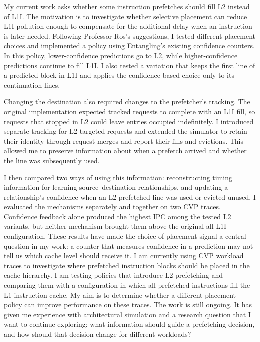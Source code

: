 \documentclass[11pt,a4paper]{article}
\begin{document}
My current work asks whether some instruction prefetches should fill L2 instead of L1I. The motivation is to investigate whether selective placement can reduce L1I pollution enough to compensate for the additional delay when an instruction is later needed. Following Professor Ros’s suggestions, I tested different placement choices and implemented a policy using Entangling’s existing confidence counters. In this policy, lower-confidence predictions go to L2, while higher-confidence predictions continue to fill L1I. I also tested a variation that keeps the first line of a predicted block in L1I and applies the confidence-based choice only to its continuation lines.

Changing the destination also required changes to the prefetcher’s tracking. The original implementation expected tracked requests to complete with an L1I fill, so requests that stopped in L2 could leave entries occupied indefinitely. I introduced separate tracking for L2-targeted requests and extended the simulator to retain their identity through request merges and report their fills and evictions. This allowed me to preserve information about when a prefetch arrived and whether the line was subsequently used.

I then compared two ways of using this information: reconstructing timing information for learning source–destination relationships, and updating a relationship’s confidence when an L2-prefetched line was used or evicted unused. I evaluated the mechanisms separately and together on two CVP traces. Confidence feedback alone produced the highest IPC among the tested L2 variants, but neither mechanism brought them above the original all-L1I configuration. These results have made the choice of placement signal a central question in my work: a counter that measures confidence in a prediction may not tell us which cache level should receive it.
I am currently using CVP workload traces to investigate where prefetched instruction blocks should be placed in the cache hierarchy. I am testing policies that introduce L2 prefetching and comparing them with a configuration in which all prefetched instructions fill the L1 instruction cache. My aim is to determine whether a different placement policy can improve performance on these traces. The work is still ongoing. It has given me experience with architectural simulation and a research question that I want to continue exploring: what information should guide a prefetching decision, and how should that decision change for different workloads?
\end{document}
